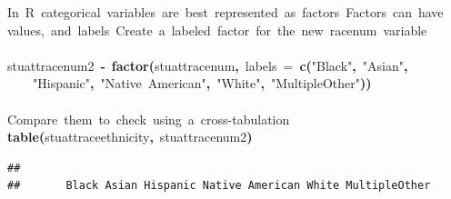 \documentclass[12pt]{article}
\makeatletter
\newcommand{\hlfunctioncall}[1]{\textcolor[rgb]{0.501960784313725,0,0.329411764705882}{\textbf{#1}}}%
\newcommand{\hlstring}[1]{\textcolor[rgb]{0.6,0.6,1}{#1}}%
\newcommand{\hlkeyword}[1]{\textcolor[rgb]{0,0,0}{\textbf{#1}}}%
\newcommand{\hlargument}[1]{\textcolor[rgb]{0.690196078431373,0.250980392156863,0.0196078431372549}{#1}}%
\newcommand{\hlcomment}[1]{\textcolor[rgb]{0.180392156862745,0.6,0.341176470588235}{#1}}%
\newcommand{\hlassignement}[1]{\textcolor[rgb]{0,0,0}{\textbf{#1}}}%
\newcommand{\hlsymbol}[1]{\textcolor[rgb]{0,0,0}{#1}}%
\newcommand{\hlstd}[1]{\textcolor[rgb]{0,0,0}{#1}}%
\newenvironment{kframe}{%
 \def\FrameCommand##1{\hskip\@totalleftmargin \hskip-\fboxsep
 \colorbox{shadecolor}{##1}\hskip-\fboxsep
     \hskip-\linewidth \hskip-\@totalleftmargin \hskip\columnwidth}%
 \MakeFramed {\advance\hsize-\width
   \@totalleftmargin\z@ \linewidth\hsize
   \@setminipage}}%
 {\par\unskip\endMakeFramed}
\newenvironment{knitrout}{}{} %
\makeatother
\begin{document}
\begin{knitrout}
\color{fgcolor}\begin{kframe}
\begin{flushleft}
\ttfamily\noindent
\hlcomment{\usebox{\hlnormalsizeboxhash}{\ }In{\ }R{\ }categorical{\ }variables{\ }are{\ }best{\ }represented{\ }as{\ }factors{\ }Factors{\ }can{\ }have}\hspace*{\fill}\\
\hlstd{}\hlcomment{\usebox{\hlnormalsizeboxhash}{\ }values,{\ }and{\ }labels{\ }Create{\ }a{\ }labeled{\ }factor{\ }for{\ }the{\ }new{\ }race\usebox{\hlnormalsizeboxunderscore}num{\ }variable}\hspace*{\fill}\\
\hlstd{}\hspace*{\fill}\\
\hlstd{}\hlsymbol{stuatt}\hlkeyword{\usebox{\hlnormalsizeboxdollar}}\hlsymbol{race\usebox{\hlnormalsizeboxunderscore}num2}{\ }\hlassignement{\usebox{\hlnormalsizeboxlessthan}-}{\ }\hlfunctioncall{factor}\hlkeyword{(}\hlsymbol{stuatt}\hlkeyword{\usebox{\hlnormalsizeboxdollar}}\hlsymbol{race\usebox{\hlnormalsizeboxunderscore}num}\hlkeyword{,}{\ }\hlargument{labels}{\ }\hlargument{=}{\ }\hlfunctioncall{c}\hlkeyword{(}\hlstring{"{}Black"{}}\hlkeyword{,}{\ }\hlstring{"{}Asian"{}}\hlkeyword{,}\hspace*{\fill}\\
\hlstd{}{\ }{\ }{\ }{\ }\hlstring{"{}Hispanic"{}}\hlkeyword{,}{\ }\hlstring{"{}Native{\ }American"{}}\hlkeyword{,}{\ }\hlstring{"{}White"{}}\hlkeyword{,}{\ }\hlstring{"{}MultipleOther"{}}\hlkeyword{)}\hlkeyword{)}\hspace*{\fill}\\
\hlstd{}\hspace*{\fill}\\
\hlstd{}\hlcomment{\usebox{\hlnormalsizeboxhash}{\ }Compare{\ }them{\ }to{\ }check{\ }using{\ }a{\ }cross-tabulation}\hspace*{\fill}\\
\hlstd{}\hlfunctioncall{table}\hlkeyword{(}\hlsymbol{stuatt}\hlkeyword{\usebox{\hlnormalsizeboxdollar}}\hlsymbol{race\usebox{\hlnormalsizeboxunderscore}ethnicity}\hlkeyword{,}{\ }\hlsymbol{stuatt}\hlkeyword{\usebox{\hlnormalsizeboxdollar}}\hlsymbol{race\usebox{\hlnormalsizeboxunderscore}num2}\hlkeyword{)}\mbox{}
\normalfont
\end{flushleft}
\begin{verbatim}
##      
##       Black Asian Hispanic Native American White MultipleOther

\end{verbatim}
\end{kframe}
\end{knitrout}
\end{document}
